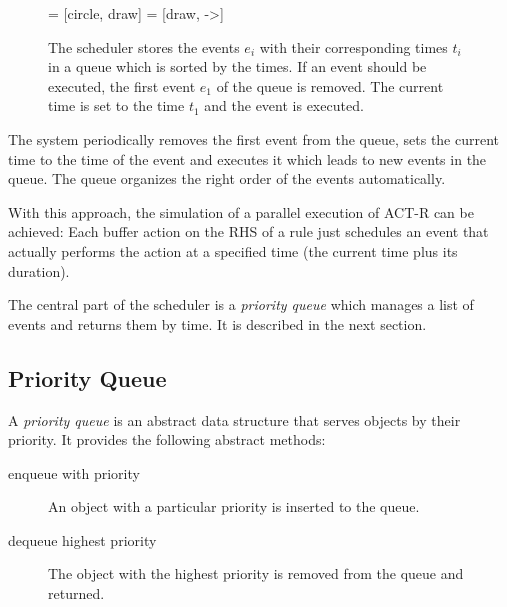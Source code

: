 \begin{figure}[htb]
\centering
{} = [circle, draw]
 = [draw, ->]

\caption{The scheduler stores the events $e_i$ with their corresponding times $t_i$ in a queue which is sorted by the times. If an event should be executed, the first event $e_1$ of the queue is removed. The current time is set to the time $t_1$ and the event is executed.}
\label{fig:scheduler}
\end{figure}

The system periodically removes the first event from the queue, sets the current time to the time of the event and executes it which leads to new events in the queue. The queue organizes the right order of the events automatically.

With this approach, the simulation of a parallel execution of ACT-R can be achieved: Each buffer action on the RHS of a rule just schedules an event that actually performs the action at a specified time (the current time plus its duration). 

The central part of the scheduler is a \emph{priority queue} which manages a list of events and returns them by time. It is described in the next section.

\subsection{Priority Queue}

A \emph{priority queue} is an abstract data structure that serves objects by their priority. It provides the following abstract methods:

\begin{description}
 \item[enqueue with priority] An object with a particular priority is inserted to the queue. 
 \item[dequeue highest priority] The object with the highest priority is removed from the queue and returned.
\end{description}


